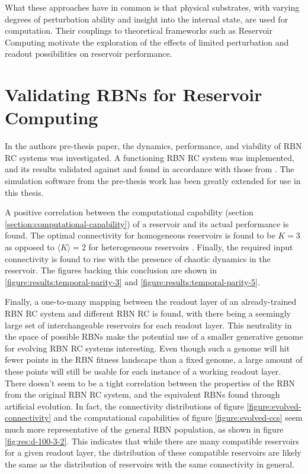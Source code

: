 What these approaches have in common is that physical substrates,
with varying degrees of perturbation ability and insight into the internal state,
are used for computation.
Their couplings to theoretical frameworks such as Reservoir Computing motivate the exploration of the effects of limited perturbation and readout possibilities on reservoir performance.

\section{Validating RBNs for Reservoir Computing}
\label{section:pre-thesis-project}

In the authors pre-thesis paper, the dynamics, performance, and viability of RBN RC systems was investigated.
A functioning RBN RC system was implemented,
and its results validated against and found in accordance with those from \cite{rbn-reservoir}.
The simulation software from the pre-thesis work has been greatly extended for use in this thesis.

A positive correlation between the computational capability (section \ref{section:computational-capability}) of a reservoir and its actual performance is found.
The optimal connectivity for homogeneous reservoirs is found to be $K=3$ as opposed to $\langle K \rangle = 2$ for heterogeneous reservoirs \cite{rbn-reservoir}.
Finally, the required input connectivity is found to rise with the presence of chaotic dynamics in the reservoir.
The figures backing this conclusion are shown in \ref{figure:results:temporal-parity-3} and \ref{figure:results:temporal-parity-5}.

Finally, a one-to-many mapping between the readout layer of an already-trained RBN RC system and different RBN RC is found,
with there being a seemingly large set of interchangeable reservoirs for each readout layer.
This neutrality in the space of possible RBNs make the potential use of a smaller generative genome for evolving RBN RC systems interesting.
Even though such a genome will hit fewer points in the RBN fitness landscape than a fixed genome,
a large amount of these points will still be usable for each instance of a working readout layer.
There doesn't seem to be a tight correlation between the properties of the RBN from the original RBN RC system,
and the equivalent RBNs found through artificial evolution.
In fact, the connectivity distributions of figure \ref{figure:evolved-connectivity} and the computational capabilities of figure \ref{figure:evolved-ccs} seem much more representative of the general RBN population, as shown in figure \ref{fig:res:d-100-3-2}.
This indicates that while there are many compatible reservoirs for a given readout layer,
the distribution of these compatible reservoirs are likely the same as the distribution of reservoirs with the same connectivity in general.

